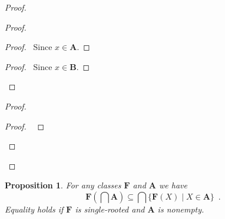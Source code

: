 \documentclass{book}
\let\qed\relax
\newtheorem{prop}[ax]{Proposition}
\theoremstyle{definition}
\begin{document}
\begin{proof}
\pf
{}
\begin{proof}
	\begin{proof}
		\pf\ Since $x \in \mathbf{A}$.
	\end{proof}
	\begin{proof}
		\pf\ Since $x \in \mathbf{B}$.
	\end{proof}
\end{proof}
\begin{proof}
	\begin{proof}
		\pf\ 
	\end{proof}
\end{proof}
\qed
\end{proof}

\begin{prop}
\label{prop:imgint}
For any classes $\mathbf{F}$ and $\mathbf{A}$ we have
\[ \mathbf{F} \left( \bigcap \mathbf{A} \right) \subseteq \bigcap \{ \mathbf{F}(X) \mid X \in \mathbf{A} \} \enspace . \]
Equality holds if $\mathbf{F}$ is single-rooted and $\mathbf{A}$ is nonempty.
\end{prop}
\end{document}

